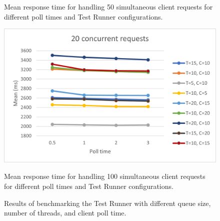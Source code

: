 \begin{figure}[!tbp]
\begin{minipage}[t]{0.4\textwidth}
    \caption{Mean response time for handling 50 simultaneous client requests for different poll times and Test Runner configurations.}
  \end{minipage}
  \hfill
  \begin{minipage}[t]{0.4\textwidth}
    \centering
    \includegraphics[scale=0.65]{images/20.png}
    \caption{Mean response time for handling 100 simultaneous client requests for different poll times and Test Runner configurations.}
  \end{minipage}
  \label{fig:results}
  \caption{Results of benchmarking the Test Runner with different queue size, number of threads, and client poll time.}

\end{figure}



